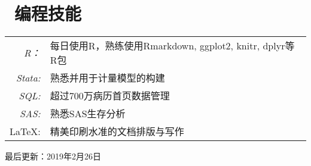 \documentclass{resume}
\begin{document}
\section{\faGears\ 编程技能}
\begin{tabular}{rl} 
	\textit{R：} & 每日使用R，熟练使用Rmarkdown, ggplot2, knitr, dplyr等R包\\
	\textit{Stata:} & 熟悉并用于计量模型的构建\\
	\textit{SQL:} & 超过700万病历首页数据管理\\
	\textit{SAS:} & 熟悉SAS生存分析\\
	{\LaTeX}: & 精美印刷水准的文档排版与写作\\
\end{tabular}


\vfill{}
\begin{center}
{\scriptsize  最后更新：2019年2月26日 }
\end{center}
\end{document}
